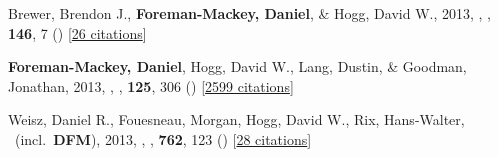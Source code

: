\item[{\color{numcolor}\scriptsize3}] Brewer, Brendon J., \textbf{Foreman-Mackey, Daniel}, \& Hogg, David W., 2013, , \aj, \textbf{146}, 7 () [\href{http://adsabs.harvard.edu/abs/2013AJ....146....7B}{26 citations}]

\item[{\color{numcolor}\scriptsize2}] \textbf{Foreman-Mackey, Daniel}, Hogg, David W., Lang, Dustin, \& Goodman, Jonathan, 2013, , \pasp, \textbf{125}, 306 () [\href{http://adsabs.harvard.edu/abs/2013PASP..125..306F}{2599 citations}]

\item[{\color{numcolor}\scriptsize1}] Weisz, Daniel R., Fouesneau, Morgan, Hogg, David W., Rix, Hans-Walter, \etal\ (incl.\ \textbf{DFM}), 2013, , \apj, \textbf{762}, 123 () [\href{http://adsabs.harvard.edu/abs/2013ApJ...762..123W}{28 citations}]